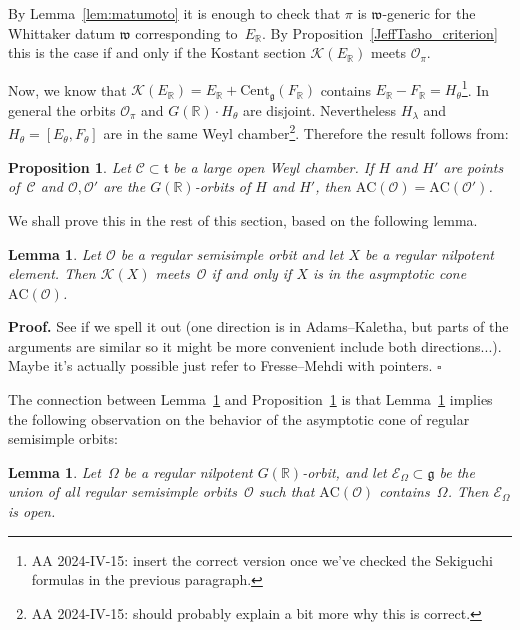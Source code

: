 \documentclass[10pt,leqno]{article}
\newtheorem{lemma}[equation]{Lemma}
\newtheorem{proposition}[equation]{Proposition}
\newcommand{\qed}{\hfill $\square$ \medskip}
\newenvironment{proof}[1][Proof]{\noindent\textbf{#1.} }{\qed}
\newcommand{\R}{\mathbb R}
\renewcommand{\t}{\mathfrak t}
\newcommand{\g}{\mathfrak g}
\newcommand{\w}{\mathfrak w}
\newcommand{\AC}{\mathrm{AC}}
\newcommand{\Kostant}[1]{\mathcal{K}(#1)}
\begin{document}
By Lemma~\ref{lem:matumoto} it is enough to check that $\pi$ is $\w$-generic for the Whittaker datum $\w$ corresponding to~$E_\R$. By Proposition~\ref{JeffTasho_criterion} this is the case if and only if the Kostant section $\Kostant{E_\R}$ meets $\mathcal{O}_\pi$. 

Now, we know that $\Kostant{E_\R}=E_\R+\mathrm{Cent}_\g(F_\R)$ contains $E_\R-F_\R = H_\theta$\footnote{AA 2024-IV-15: insert the correct version once we've checked the Sekiguchi formulas in the previous paragraph. }.
In general the orbits $\mathcal{O}_\pi$ and $G(\R) \cdot H_\theta$ are disjoint. 
Nevertheless $H_{\lambda}$ and $H_\theta=[E_\theta, F_\theta]$ are in the same Weyl chamber\footnote{AA 2024-IV-15: should probably explain a bit more why this is correct.}.
Therefore the result follows from:  

\begin{proposition}\label{prop:AC_chamber} Let $\mathcal{C} \subset \t$ be a large open Weyl chamber.
If $H$ and $H'$ are  points of~$\mathcal{C}$ and $\mathcal{O}, \mathcal{O}'$ are the   $G(\R)$-orbits of $H$ and $H'$, then $\AC(\mathcal{O})=\AC(\mathcal{O}')$.
\end{proposition}

We shall prove this in the rest of this section, based on the following lemma.

\begin{lemma}\label{lem:Kost_and_AC} Let $\mathcal{O}$ be a regular semisimple orbit and  let $X$ be a regular nilpotent element. Then $\Kostant{X}$ meets~$\mathcal{O}$ if and only if $X$ is in the asymptotic cone~$\AC(\mathcal{O})$. 
\end{lemma}
\begin{proof} See if we spell it  out (one direction is in Adams--Kaletha, but parts of the arguments are similar so it might be more convenient include both directions...). Maybe it's actually possible just refer to Fresse--Mehdi with pointers. \end{proof}

The connection between Lemma~\ref{lem:Kost_and_AC} and Proposition~\ref{prop:AC_chamber} is that Lemma~\ref{lem:Kost_and_AC}  implies the  following observation on the behavior of the asymptotic cone of regular semisimple orbits: 

\begin{lemma}\label{lem:AC_containment} Let~$\Omega$ be a regular nilpotent $G(\R)$-orbit, and let $\mathcal{E}_\Omega \subset \g$ be the union of all regular semisimple orbits~$\mathcal{O}$ such that $\AC(\mathcal{O})$ contains~$\Omega$. Then $\mathcal{E}_\Omega$ is open. 
\end{lemma}
\end{document}
